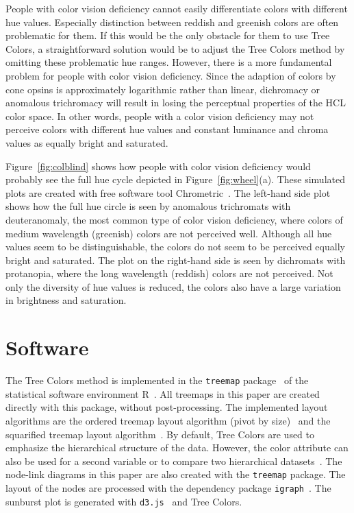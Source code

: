 \documentclass[journal]{vgtc}                %
\begin{document}
People with color vision deficiency cannot easily differentiate colors with different hue values. Especially distinction between reddish and greenish colors are often problematic for them. If this would be the only obstacle for them to use Tree Colors, a straightforward solution would be to adjust the Tree Colors method by omitting these problematic hue ranges. However, there is a more fundamental problem for people with color vision deficiency. Since the adaption of colors by cone opsins is approximately logarithmic rather than linear, dichromacy or anomalous trichromacy will result in losing the perceptual properties of the HCL color space. In other words, people with a color vision deficiency may not perceive colors with different hue values and constant luminance and chroma values as equally bright and saturated.

Figure~\ref{fig:colblind} shows how people with color vision deficiency would probably see the full hue cycle depicted in Figure~\ref{fig:wheel}(a). These simulated plots are created with free software tool Chrometric~\cite{chrometric}. The left-hand side plot shows how the full hue circle is seen by anomalous trichromats with deuteranomaly, the most common type of color vision deficiency, where colors of medium wavelength (greenish) colors are not perceived well. Although all hue values seem to be distinguishable, the colors do not seem to be perceived equally bright and saturated. The plot on the right-hand side is seen by dichromats with protanopia, where the long wavelength (reddish) colors are not perceived. Not only the diversity of hue values is reduced, the colors also have a large variation in brightness and saturation.




\section{Software}\label{secsoft}

The Tree Colors method is implemented in the \texttt{treemap} package~\cite{treemap} of the statistical software environment R~\cite{r2013}. All treemaps in this paper are created directly with this package, without post-processing. The implemented layout algorithms are the ordered treemap layout algorithm (pivot by size)~\cite{Bederson2002} and the squarified treemap layout algorithm~\cite{bruls99}. By default, Tree Colors are used to emphasize the hierarchical structure of the data. However, the color attribute can also be used for a second variable or to compare two hierarchical datasets~\cite{tennekes2011b}. The node-link diagrams in this paper are also created with the \texttt{treemap} package. The layout of the nodes are processed with the dependency package \texttt{igraph}~\cite{igraph}. The sunburst plot is generated with \texttt{d3.js}~\cite{bostock2012d3} and Tree Colors.
\end{document}

